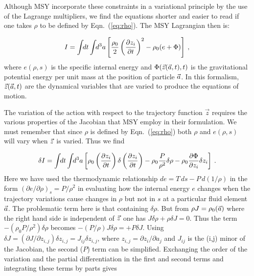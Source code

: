 Although MSY incorporate these constraints in a variational principle by the
use of the Lagrange multipliers, we find the equations shorter and easier to
read if one takes $\rho$ to be defined by Eqn.~(\ref{eq:rho}).
The MSY Lagrangian then is:

\begin{equation}\label{eq:MSY}
    I  =  \int\!\! dt \int\!\! d^3a \left[\frac{\rho_0}{2} \left(
          \frac{\partial z_i}{\partial t}\right)^2 - \rho_0(e+\Phi) \right] \: ,
\end{equation}
%
where $e(\rho,s)$ is the specific internal energy and $\Phi({\vec z}({\vec a},t),t)$ is the
gravitational potential energy per unit mass at the position of particle ${\vec a}$.
In this formalism, ${\vec z}({\vec a},t)$ are the dynamical variables that are varied
to produce the equations of motion.

The variation of the action with respect to the trajectory function ${\vec z}$
requires the various properties of the Jacobian that MSY employ in their
formulation. We must remember that since $\rho$ is defined by
Eqn.~(\ref{eq:rho}) both $\rho$ and $e(\rho,s)$ will vary when ${\vec z}$ is varied.
Thus we find

\begin{equation}
    \delta I = \int\!\! dt \int\!\! d^3a \left[ \rho_0
    \left(\frac{\partial z_i}{\partial t}\right)\delta
    \left(\frac{\partial z_i}{\partial t} \right)
    - \rho_0 \frac{P}{\rho^2} \delta \rho
    - \rho_0 \frac{\partial \Phi}{\partial z_i} \delta {z_i}
    \right] \: .
\end{equation}
%
Here we have used the thermodynamic relationship $de = T\,ds -P\,d(1/\rho)$ in
the form $(\partial e/\partial \rho)_s = P/\rho^2$ in evaluating how the
internal energy $e$ changes when the trajectory variations cause changes in
$\rho$ but not in $s$ at a particular fluid element ${\vec a}$.  The problematic
term here is that containing $\delta \rho$.  But from $\rho J = \rho_0({\vec a})$
where the right hand side is independent of ${\vec z}$ one has
$J \delta \rho + \rho \delta J = 0$.  Thus the term
$-(\rho_0 {P}/{\rho^2}) \delta \rho$ becomes
$-(P/\rho) J \delta \rho = + P \delta J$.  Using $\delta J = ({\partial J}/
{\partial z_{i,j}}) \delta z_{i,j} = J_{ij} \delta z_{i,j}$,
where $z_{i,j} = {\partial z_i}/{\partial a_j}$ and $J_{ij}$ is the (i,j)
minor of the Jacobian, the second ($P$) term can be simplified.  Exchanging
the order of the variation and the partial differentiation in the first and
second terms and integrating these terms by parts gives

